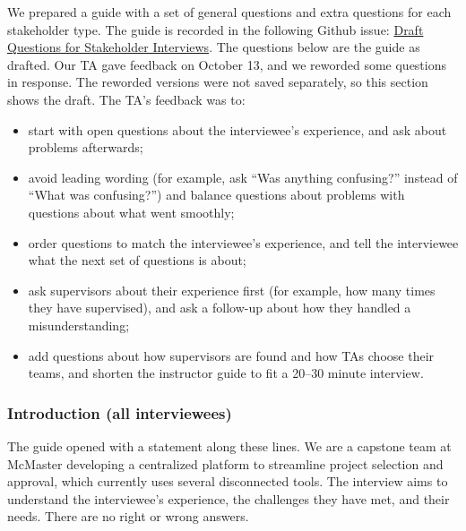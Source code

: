 \documentclass{article}
\begin{document}
    We prepared a guide with a set of general questions and extra questions for each
    stakeholder type. The guide is recorded in the following Github issue:
    \href{https://github.com/Ayushpatel2026/Keystone/issues/3}{Draft Questions for Stakeholder Interviews}.
    The questions below are the guide as drafted. Our TA gave feedback on October 13, and we
    reworded some questions in response. The reworded versions were not saved
    separately, so this section shows the draft. The TA's feedback was to:

    \begin{itemize}
        \item start with open questions about the interviewee's experience, and ask
        about problems afterwards;
        \item avoid leading wording (for example, ask ``Was anything confusing?''
        instead of ``What was confusing?'') and balance questions about
        problems with questions about what went smoothly;
        \item order questions to match the interviewee's experience, and tell
        the interviewee what the next set of questions is about;
        \item ask supervisors about their experience first (for example, how many
        times they have supervised), and ask a follow-up about how they handled
        a misunderstanding;
        \item add questions about how supervisors are found and how TAs choose
        their teams, and shorten the instructor guide to fit a 20--30 minute
        interview.
    \end{itemize}

    \subsubsection*{Introduction (all interviewees)}

    The guide opened with a statement along these lines. We are a capstone team
    at McMaster developing a centralized platform to streamline project
    selection and approval, which currently uses several disconnected tools. The
    interview aims to understand the interviewee's experience, the challenges they
    have met, and their needs. There are no right or wrong answers.
\end{document}
